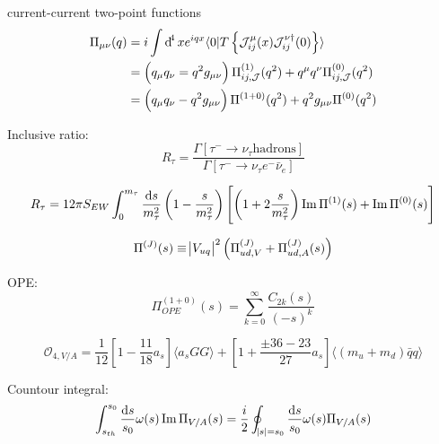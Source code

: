 \documentclass{article}
\begin{document}
  current-current two-point functions
  \begin{equation}
    \begin{split}
      \Pi_{\mu\nu}(q) &= i \int \dif^4 x e^{iqx} \langle  0 | T \left\{ \mathcal{J}_{ij}^{\mu}(x) \mathcal{J}_{ij}^{\nu\dagger}(0) \right\} \rangle \\
      &= \left(q_\mu q_\nu = q^2 g_{\mu\nu}\right) \Pi_{ij,\mathcal{J}}^{(1)}(q^2) + q^\mu q^\nu \Pi_{ij,\mathcal{J}}^{(0)} (q^2) \\
      &= \left( q_\mu q_\nu - q^2 g_{\mu\nu} \right) \Pi^{(1+0)}(q^2) + q^2 g_{\mu\nu} \Pi^{(0)}(q^2)
    \end{split}
  \end{equation}
  
  Inclusive ratio:
  \begin{equation}
    R_\tau = \frac{\Gamma [ \tau^- \to \nu_\tau \text{hadrons}]}{\Gamma [ \tau^- \to \nu_\tau e^- \bar\nu_e]}
  \end{equation}

  \begin{equation}
    R_{\tau} = 12 \pi S_{EW} \int_0^{m_\tau} \frac{\dif s}{m_\tau^2} \left( 1 - \frac{s}{m_\tau^2}\right) \left[ \left( 1+2\frac{s}{m_\tau^2} \right) \operatorname{Im} \Pi^{(1)}(s) + \operatorname{Im} \Pi^{(0)}(s)\right]
  \end{equation}

  \begin{equation}
    \Pi^{(J)}(s) \equiv \envert{V_{uq}}^2 \left( \Pi_{ud,V}^{(J)} + \Pi_{ud,A}^{(J)}(s) \right)
  \end{equation}
  
  OPE:
  \begin{equation}
    \Pi_{OPE}^{(1+0)}(s) = \sum_{k=0}^{\infty}\frac{C_{2k}(s)}{(-s)^k}
  \end{equation}

  \begin{equation}
    \mathcal{O}_{4,V/A} = \frac{1}{12}\left[ 1 - \frac{11}{18} a_s \right] \langle a_s GG \rangle + \left[ 1 + \frac{\pm 36 - 23}{27} a_s \right] \langle (m_u + m_d) \bar q q \rangle
  \end{equation}
  

  Countour integral:
  \begin{equation}
    \int_{s_{th}}^{s_0} \frac{\dif s}{s_0} \omega(s) \operatorname{Im} \Pi_{V/A}(s) = \frac{i}{2} \oint_{\envert{s}=s_0} \frac{\dif s}{s_0} \omega(s) \Pi_{V/A}(s)
  \end{equation}
\end{document}
